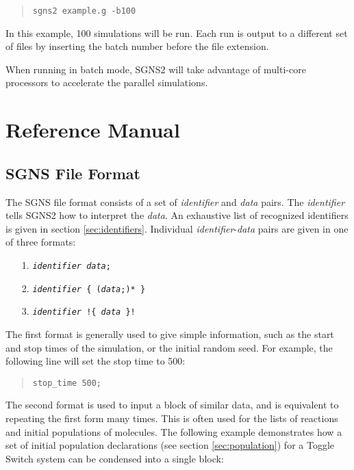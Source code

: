 \documentclass[10pt]{article}
\newcommand{\code}[1]{{\tt {#1}}}
\newcommand{\codeparam}[1]{\textrm{\textit{#1}}}
\newcommand{\programname}{SGNS2}
\newcommand{\progexe}{sgns2}
\begin{document}
\begin{quote}
\code{\progexe\ example.g -b100}
\end{quote}

In this example, 100 simulations will be run. Each run is output to a different set of files by inserting the batch number before the file extension.

When running in batch mode, {\programname} will take advantage of multi-core processors to accelerate the parallel simulations.



\section{Reference Manual}

\subsection{SGNS File Format}

The SGNS file format consists of a set of \textit{identifier} and \textit{data} pairs. The \codeparam{identifier} tells {\programname} how to interpret the \codeparam{data}. An exhaustive list of recognized identifiers is given in section \ref{sec:identifiers}. Individual \codeparam{identifier}-\codeparam{data} pairs are given in one of three formats:

\begin{itemize}
\item[1.] \code{\codeparam{identifier} \codeparam{data};}
\item[2.] \code{\codeparam{identifier} \{ (\codeparam{data};)* \}}
\item[3.] \code{\codeparam{identifier} !\{ \codeparam{data} \}!}
\end{itemize}

The first format is generally used to give simple information, such as the start and stop times of the simulation, or the initial random seed. For example, the following line will set the stop time to 500:

\begin{quote}
\code{stop\_time 500;}
\end{quote}

The second format is used to input a block of similar data, and is equivalent to repeating the first form many times. This is often used for the lists of reactions and initial populations of molecules. The following example demonstrates how a set of initial population declarations (see section \ref{sec:population}) for a Toggle Switch system can be condensed into a single block:
\end{document}
